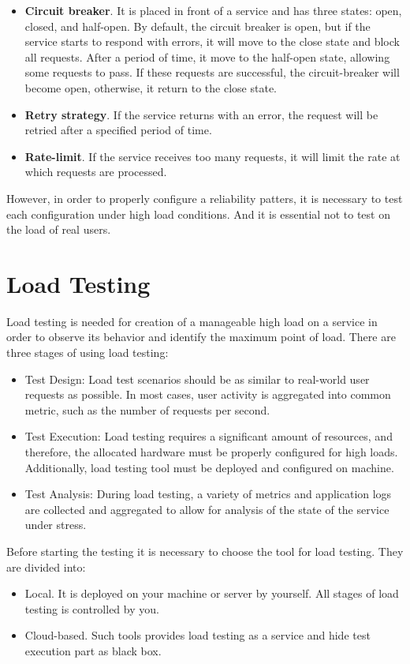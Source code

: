 \begin{itemize}
\item \textbf{Circuit breaker}. It is placed in front of a service and has three states: open, closed, and half-open. By default, the circuit breaker is open, but if the service starts to respond with errors, it will move to the close state and block all requests. After a period of time, it move to the half-open state, allowing some requests to pass. If these requests are successful, the circuit-breaker will become open, otherwise, it return to the close state.
\item \textbf{Retry strategy}. If the service returns with an error, the request will be retried after a specified period of time.
\item \textbf{Rate-limit}. If the service receives too many requests, it will limit the rate at which requests are processed.
\end{itemize}

However, in order to properly configure a reliability patters, it is necessary to test each configuration under high load conditions. And it is essential not to test on the load of real users.

\section{Load Testing}\label{sec:load-testing}
Load testing\cite{load_testing_wiki} is needed for creation of a manageable high load on a service in order to observe its behavior and identify the maximum point of load. There are three stages of using load testing:

\begin{itemize}
\item Test Design: Load test scenarios should be as similar to real-world user requests as possible. In most cases, user activity is aggregated into common metric, such as the number of requests per second.
\item Test Execution: Load testing requires a significant amount of resources, and therefore, the allocated hardware must be properly configured for high loads. Additionally, load testing tool must be deployed and configured on machine.
\item Test Analysis: During load testing, a variety of metrics and application logs are collected and aggregated to allow for analysis of the state of the service under stress.
\end{itemize}

Before starting the testing it is necessary to choose the tool for load testing. They are divided into:
\begin{itemize}
\item Local. It is deployed on your machine or server by yourself. All stages of load testing is controlled by you.
\item Cloud-based. Such tools provides load testing as a service and hide test execution part as black box.
\end{itemize}

